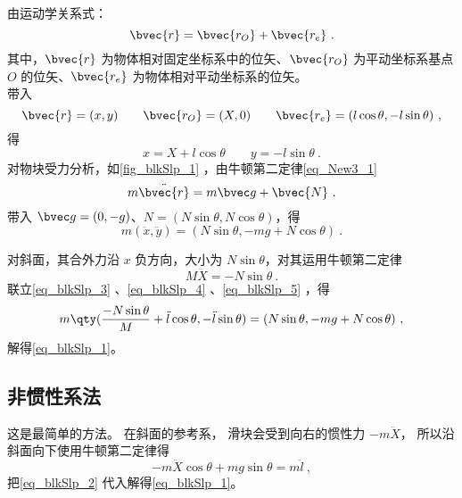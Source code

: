 由运动学关系式：
\begin{equation}
\bvec{r}=\bvec{r_{O}}+\bvec{r_{e}}~.
\end{equation}
其中，$\bvec{r}$ 为物体相对固定坐标系中的位矢、$\bvec{r_{O}}$ 为平动坐标系基点 $O$ 的位矢、$\bvec{r_{e}}$ 为物体相对平动坐标系的位矢。\\
带入
\begin{equation}
\bvec{r}=(x,y)\qquad \bvec{r_O}=(X,0)\qquad \bvec{r_e}=(l\cos\theta,-l\sin\theta)~,
\end{equation}
得
\begin{equation}\label{eq_blkSlp_3}
x=X+l\cos\theta \qquad y=-l\sin\theta~.
\end{equation}
对物块受力分析，如\autoref{fig_blkSlp_1} ，由牛顿第二定律\autoref{eq_New3_1}~
\begin{equation}
m\ddot{\bvec{r}}=m\bvec g+\bvec{N}~.
\end{equation}
带入 $\bvec g=(0,-g)$、$N=(N\sin\theta,N\cos\theta)$，得
\begin{equation}\label{eq_blkSlp_4}
m(\ddot x,\ddot y)=(N\sin\theta,-mg+N\cos\theta)~.
\end{equation}

对斜面，其合外力沿 $x$ 负方向，大小为 $N\sin\theta$，对其运用牛顿第二定律
\begin{equation}\label{eq_blkSlp_5}
M\ddot X=-N\sin \theta~.
\end{equation}
联立\autoref{eq_blkSlp_3} 、\autoref{eq_blkSlp_4} 、\autoref{eq_blkSlp_5} ，得
\begin{equation}
m\qty(\frac{-N\sin\theta}{M}+\ddot l\cos\theta,-\ddot l\sin\theta)=(N\sin\theta,-mg+N\cos\theta)~,
\end{equation}
解得\autoref{eq_blkSlp_1}。

\subsection{非惯性系法}
这是最简单的方法。 在斜面的参考系， 滑块会受到向右的惯性力 $-m\ddot X$， 所以沿斜面向下使用牛顿第二定律得
\begin{equation}
-m\ddot X\cos\theta + mg\sin\theta = m\ddot l~,
\end{equation}
把\autoref{eq_blkSlp_2} 代入解得\autoref{eq_blkSlp_1}。

